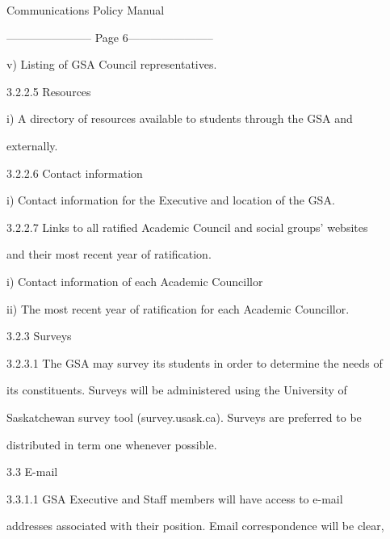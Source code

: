                                     Communications Policy Manual  

  


----------------------- Page 6-----------------------

  

     v)       Listing of GSA Council representatives.   

  

3.2.2.5            Resources   

  

     i)       A  directory  of  resources  available  to  students  through  the  GSA  and  

              externally.   

  

3.2.2.6            Contact information  

     i)       Contact information for the Executive and location of the GSA.   

  

3.2.2.7            Links  to  all  ratified  Academic  Council  and  social  groups’  websites  

          and their most recent year of ratification.  

         i) Contact information of each Academic Councillor   

         ii) The most recent year of ratification for each Academic Councillor.  

  

3.2.3  Surveys  

  

3.2.3.1            The GSA may survey its students in order to determine the needs of  

         its  constituents.  Surveys  will  be  administered  using  the  University  of  

          Saskatchewan  survey  tool  (survey.usask.ca).  Surveys  are  preferred  to  be  

          distributed in term one whenever possible.    

  

  

                                              3.3      E-mail   

  

3.3.1.1            GSA   Executive   and   Staff   members   will  have   access   to   e-mail  

          addresses associated with their position. Email correspondence will be clear,  

